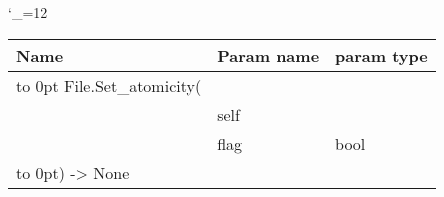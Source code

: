 \begingroup \catcode`\_=12 \tt
\begin{tabular}{lll}
\toprule
\textrm{Name}&\textrm{Param name}&\textrm{param type}\\
\midrule
\hbox to 0pt {File.Set_atomicity(\hss}\\
& self\\
& flag & bool\\
\hbox to 0pt{) -> None\hss}\\
\bottomrule
\end{tabular}
\endgroup
